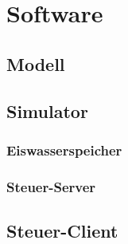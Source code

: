 \chapter{Software}
	\section{Modell}
	\section{Simulator}
		\subsection{Eiswasserspeicher}
		\subsection{Steuer-Server}
	\section{Steuer-Client}